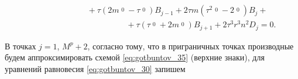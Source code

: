 \begin{equation}
\begin{array}{l}
\\

\hspace{3cm}

+\tau(2m\mathop{\xi_{14}}\limits^{0}-\tau\mathop{\xi_{15}}\limits^{0})B_{j-1}+

2\tau m(\tau^2\mathop{\xi_{11}}\limits^{0}-2\mathop{\xi_{14}}\limits^{0})B_j+

\\ 

\hspace{5cm}

+\tau(\tau\mathop{\xi_{15}}\limits^{0}+2m\mathop{\xi_{14}}\limits^{0})B_{j+1}+2\tau^3r^3n^2D_j=0.

\end{array}

\label{eq:gotbuntov_39}

\end{equation}



В точках $j=1$, $M^p+2$, согласно тому, что в приграничных точках производные будем аппроксимировать схемой \eqref{eq:gotbuntov_35} (верхние знаки), для уравнений равновесия \eqref{eq:gotbuntov_30} запишем

